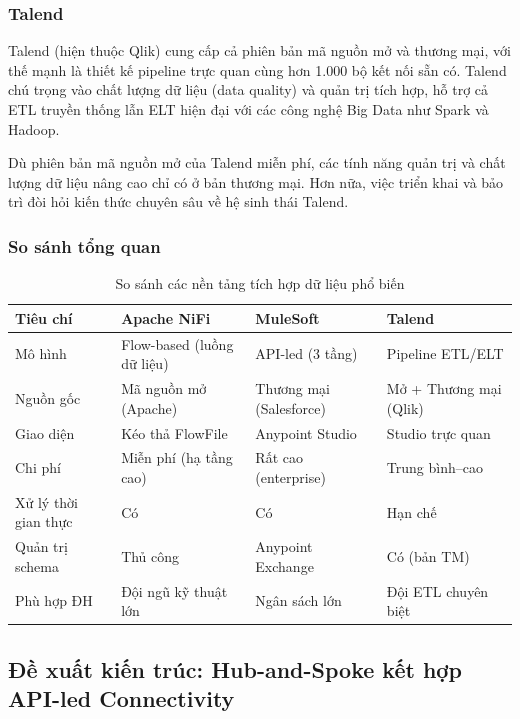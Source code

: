 \subsubsection{Talend}

Talend (hiện thuộc Qlik) cung cấp cả phiên bản mã nguồn mở và thương mại, với thế mạnh là thiết kế pipeline trực quan cùng hơn 1.000 bộ kết nối sẵn có. Talend chú trọng vào chất lượng dữ liệu (data quality) và quản trị tích hợp, hỗ trợ cả ETL truyền thống lẫn ELT hiện đại với các công nghệ Big Data như Spark và Hadoop.

Dù phiên bản mã nguồn mở của Talend miễn phí, các tính năng quản trị và chất lượng dữ liệu nâng cao chỉ có ở bản thương mại. Hơn nữa, việc triển khai và bảo trì đòi hỏi kiến thức chuyên sâu về hệ sinh thái Talend.

\subsubsection{So sánh tổng quan}

\begin{table}[H]
\centering
\renewcommand{\arraystretch}{1.4}
\begin{tabularx}{\textwidth}{|l|X|X|X|}
\hline
\textbf{Tiêu chí} & \textbf{Apache NiFi} & \textbf{MuleSoft} & \textbf{Talend} \\
\hline
Mô hình & Flow-based (luồng dữ liệu) & API-led (3 tầng) & Pipeline ETL/ELT \\
\hline
Nguồn gốc & Mã nguồn mở (Apache) & Thương mại (Salesforce) & Mở + Thương mại (Qlik) \\
\hline
Giao diện & Kéo thả FlowFile & Anypoint Studio & Studio trực quan \\
\hline
Chi phí & Miễn phí (hạ tầng cao) & Rất cao (enterprise) & Trung bình–cao \\
\hline
Xử lý thời gian thực & Có & Có & Hạn chế \\
\hline
Quản trị schema & Thủ công & Anypoint Exchange & Có (bản TM) \\
\hline
Phù hợp ĐH & Đội ngũ kỹ thuật lớn & Ngân sách lớn & Đội ETL chuyên biệt \\
\hline
\end{tabularx}
\caption{So sánh các nền tảng tích hợp dữ liệu phổ biến}
\label{tab:platform-comparison}
\end{table}

\subsection{Đề xuất kiến trúc: Hub-and-Spoke kết hợp API-led Connectivity}

